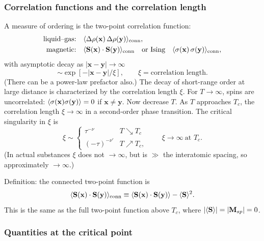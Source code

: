 \subsubsection*{Correlation functions and the correlation length}

A measure of ordering is the two-point correlation function:
\begin{align*}
  \text{liquid--gas:}&\quad\langle \Delta\rho(\mathbf{x})\,\Delta\rho(\mathbf{y})\rangle_{\text{conn}},\\
  \text{magnetic:}&\quad\langle \mathbf{S}(\mathbf{x})\cdot\mathbf{S}(\mathbf{y})\rangle_{\text{conn}}
  \quad\text{or Ising}\quad \langle \sigma(\mathbf{x})\,\sigma(\mathbf{y})\rangle_{\text{conn}},
\end{align*}
with asymptotic decay as $|\mathbf{x}-\mathbf{y}|\to\infty$
\begin{equation}
  \sim\exp\left[-|\mathbf{x}-\mathbf{y}|/\xi\right],\qquad \xi = \text{correlation length}.
\end{equation}
(There can be a power-law prefactor also.) The decay of short-range order at large
distance is characterized by the correlation length $\xi$. For $T\to\infty$, spins are
uncorrelated: $\langle \sigma(\mathbf{x})\sigma(\mathbf{y})\rangle = 0$ if $\mathbf{x}\ne\mathbf{y}$.
Now decrease $T$. As $T$ approaches $T_c$, the correlation length $\xi\to\infty$ in a
second-order phase transition. The critical singularity in $\xi$ is
\begin{equation}
  \xi\sim
  \begin{cases}
    \tau^{-\nu} & T\searrow T_c\\
    (-\tau)^{-\nu'} & T\nearrow T_c,
  \end{cases}
  \qquad \xi\to\infty\ \text{at } T_c.
\end{equation}
(In actual substances $\xi$ does not $\to\infty$, but is $\gg$ the interatomic spacing,
so approximately $\to\infty$.)

Definition: the connected two-point function is
\begin{equation}
  \langle \mathbf{S}(\mathbf{x})\cdot\mathbf{S}(\mathbf{y})\rangle_{\text{conn}}
  \equiv \langle \mathbf{S}(\mathbf{x})\cdot\mathbf{S}(\mathbf{y})\rangle - \langle \mathbf{S}\rangle^2 .
\end{equation}
This is the same as the full two-point function above $T_c$, where
$|\langle \mathbf{S}\rangle| = |\mathbf{M}_{sp}| = 0$.

\subsubsection*{Quantities at the critical point}

